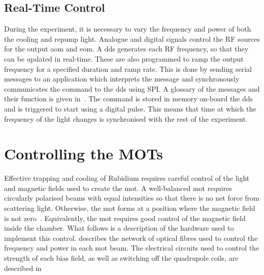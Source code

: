 \subsection{Real-Time Control} \label{subsec:muquans_comm}
During the experiment, it is necessary to vary the frequency and power of both
the cooling and repump light.
Analogue and digital signals control the RF sources for the output \ac{aom} and
\ac{eom}. A \ac{dds} generates each RF frequency, so that they can be updated in real-time.
These are also
programmed to ramp the output frequency for a specified duration and
ramp rate. This is done by sending serial messages to an
application which interprets the message and synchronously communicates the command to the \ac{dds} using
SPI. A glossary of the messages and their function is given
in~. The command is stored in memory on-board the \ac{dds} and
is triggered to start using a digital pulse. This means that time at which the frequency of the light changes is synchronised with the rest of the experiment. 
\section{Controlling the MOTs}\label{sec:mot_control}
Effective trapping and cooling of Rubidium requires careful control of the light
and magnetic fields used to create the \ac{mot}. A well-balanced \ac{mot} requires circularly polarised beams with equal intensities so that there is no net force from scattering light. Otherwise, the \ac{mot} forms at a position where the magnetic field is not zero~\cite{Steane1992}. Equivalently, the \ac{mot} requires good control of the magnetic field inside the chamber. What follows is a
description of the hardware used to implement this control.  describes the network of optical fibres used to control the frequency and power in each \ac{mot} beam. The electrical circuits used to control the strength of each bias field, as well as switching off the quadrupole coils, are described in~
